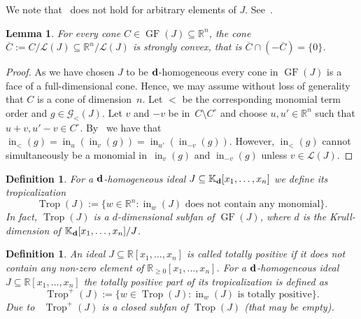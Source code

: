 \documentclass[pdftex]{sigma}%
\newtheorem{Lemma}[Theorem]{Lemma}
\newtheorem{Definition}[Theorem]{Definition}
\numberwithin{equation}{section}
\DeclareMathOperator{\init}{in}
\DeclareMathOperator{\GF}{GF}
\DeclareMathOperator{\trop}{Trop}
\begin{document}
We note that~ does not hold for arbitrary elements of $J$. See~.

\begin{Lemma}
For every cone $C\in\GF(J) \subseteq \mathbb R^n$, the cone $\overline C :=C / \mathcal{L}(J)\subseteq \mathbb R^n / \mathcal{L}(J)$ is strongly convex, that is $\overline C\cap (- \overline C)=\{0\}$.
\end{Lemma}
\begin{proof}
As we have chosen $J$ to be ${\bf d}$-homogeneous every cone in $\GF(J)$ is a face of a full-dimensional cone.
Hence, we may assume without loss of generality that $C$ is a cone of dimension~$n$.
Let $<$ be the corresponding monomial term order and $g\in\mathcal{G}_<(J)$.
Let $v$ and $-v$ be in~$C\setminus C^\circ$ and choose $u,u' \in \mathbb{R}^n$ such that $u+v,u'-v \in C^{\circ}$. By~ we have that
$\init_{<}(g)=\init_u(\init_v(g))=\init_{u'}(\init_{-v}(g))$. However, $\init_{<}(g)$ cannot simultaneously be a monomial in~$\init_v(g)$ and $\init_{-v}(g)$ unless $v\in \mathcal L(J)$.
\end{proof}

\begin{Definition}
For a ${\bf d}$-homogeneous ideal $J\subseteq \mathbb K_{\bf d}[x_1, \dots , x_n]$ we define its {\it tropicalization}
\begin{displaymath}
\trop(J):=\big\{w\in \mathbb R^n \colon \init_w(J) \text{ does not contain any monomial}\big\}.
\end{displaymath}
In fact, $\trop(J)$ is a $d$-dimensional subfan of $\GF(J)$, where $d$ is the Krull-dimension of $\mathbb K_{\bf d}[x_1,\dots,\linebreak x_n]/J$.
\end{Definition}


\begin{Definition}
An ideal $J\subseteq \mathbb R[x_1,\dots,x_n]$ is called {\it totally positive} if it does not contain any non-zero element of $\mathbb R_{\ge 0}[x_1,\dots,x_n]$.
For a ${\bf d}$-homogeneous ideal $J\subseteq \mathbb R[x_1,\dots,x_n]$ the {\it totally positive part} of its tropicalization is defined as
\begin{displaymath}
\trop^+(J):=\{w\in \trop(J)\colon \init_w(J) \text{ is totally positive}\}.
\end{displaymath}
Due to~\cite{SW05} $\trop^+(J)$ is a closed subfan of $\trop(J)$ (that may be empty).
\end{Definition}
\end{document}
